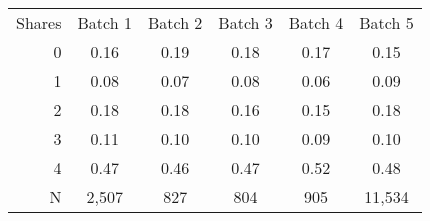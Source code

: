 
\begin{tabular}[t]{rccccc}
Shares & Batch 1 & Batch 2 & Batch 3 & Batch 4 & Batch 5\\
 \cmidrule(lr){2-2}  \cmidrule(lr){3-3}  \cmidrule(lr){4-4} \cmidrule(lr){5-5} \cmidrule(lr){6-6} 
0 & 0.16 & 0.19 & 0.18 & 0.17 & 0.15\\
1 & 0.08 & 0.07 & 0.08 & 0.06 & 0.09\\
2 & 0.18 & 0.18 & 0.16 & 0.15 & 0.18\\
3 & 0.11 & 0.10 & 0.10 & 0.09 & 0.10\\
4 & 0.47 & 0.46 & 0.47 & 0.52 & 0.48\\
N & 2,507 & 827 & 804 & 905 & 11,534
\end{tabular}
